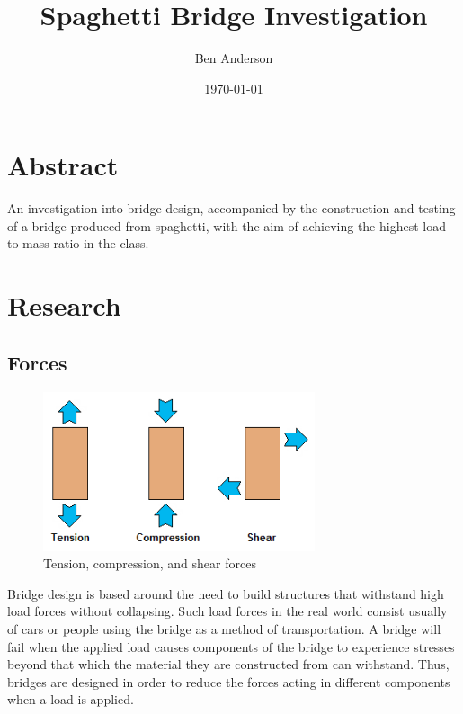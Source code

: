 \documentclass[a4paper,11pt]{article}
\begin{document}
\title{Spaghetti Bridge Investigation}
\author{Ben Anderson}
\date{\today}
\maketitle

\pagebreak

\tableofcontents
\pagebreak


\section{Abstract}

An investigation into bridge design, accompanied by the construction and testing
of a bridge produced from spaghetti, with the aim of achieving the highest load
to mass ratio in the class.




\section{Research}

\subsection{Forces}

\begin{figure}
\begin{center}
\includegraphics[width=8cm]{figures/forces.png}
\end{center}
\caption{Tension, compression, and shear forces}
\label{research:forces}
\end{figure}

Bridge design is based around the need to build structures that withstand high
load forces without collapsing.
Such load forces in the real world consist usually of cars or people using the
bridge as a method of transportation.
A bridge will fail when the applied load causes components of the bridge to
experience stresses beyond that which the material they are constructed from can
withstand.
Thus, bridges are designed in order to reduce the forces acting in different
components when a load is applied.
\end{document}
